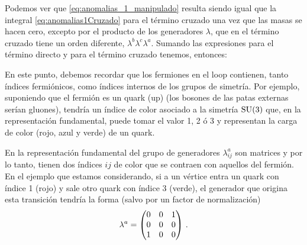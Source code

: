 Podemos ver que \eqref{eq:anomalias_1_manipulado} resulta siendo igual que la integral \eqref{eq:anomalias1Cruzado} para el término cruzado una vez que las masas se hacen cero, excepto por el producto de los generadores $\lambda$, que en el término cruzado tiene un orden diferente, $\lambda^b \lambda^c \lambda^a$. Sumando las expresiones para el término directo y para el término cruzado tenemos, entonces:
%

En este punto, debemos recordar que los fermiones en el loop contienen, tanto índices fermiónicos, como índices internos de los grupos de simetría. Por ejemplo, suponiendo que el fermión es un quark (up) (los bosones de las patas externas serían gluones), tendría un índice de color asociado a la simetría $\mathrm{SU}(3)$ que, en la representación fundamental, puede tomar el valor 1, 2 ó 3 y representan la carga de color (rojo, azul y verde) de un quark.

En la representación fundamental del grupo de generadores $\lambda^a_{ij}$ son matrices y por lo tanto, tienen dos índices $ij$ de color que se contraen con aquellos del fermión. En el ejemplo que estamos considerando, si a un vértice entra un quark con índice 1 (rojo) y sale otro quark con índice 3 (verde), el generador que origina esta transición tendría la forma (salvo por un factor de normalización)
%
\begin{equation*}
	\lambda^a = \pmqty{0 & 0 & 1 \\ 0 & 0 & 0 \\ 1 & 0 & 0} \,.
\end{equation*}

